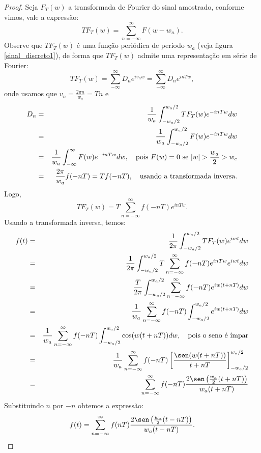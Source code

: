 \begin{proof} Seja $F_T(w)$ a transformada de Fourier do sinal amostrado, conforme vimos, vale a expressão:
\begin{equation}
TF_T(w)=\sum_{n=-\infty}^\infty F(w-w_n).
\end{equation}
Observe que $TF_T(w)$ é uma função periódica de período $w_a$ (veja figura \ref{sinal_discreto1}), de forma que $TF_T(w)$ admite uma representação em série de Fourier:
\begin{equation}
TF_T(w)=\sum_{-\infty}^\infty D_n e^{iv_n w}=\sum_{-\infty}^\infty D_n e^{in Tw},
\end{equation}
onde usamos que $v_n=\frac{2\pi n}{w_a}=Tn$ e 
\begin{eqnarray*}
D_n&=&\frac{1}{w_a}\int_{-w_a/2}^{w_a/2}TF_T(w)e^{-in Tw}dw\\
&=&\frac{1}{w_a}\int_{-w_a/2}^{w_a/2}F(w)e^{-in Tw}dw\\
&=&\frac{1}{w_a}\int_{-\infty}^{\infty}F(w)e^{-in T w}dw,\quad \hbox{pois}\ F(w)=0\ \hbox{se}\ |w|>\frac{w_a}{2}>w_c\\
&=&\frac{2\pi}{w_a}f(-nT)=Tf(-nT),\quad \hbox{usando a transformada inversa}.
\end{eqnarray*}
Logo,
\begin{equation}
TF_T(w)=T\sum_{n=-\infty}^\infty f(-nT) e^{in Tw}.
\end{equation}
Usando a transformada inversa, temos:
\begin{eqnarray*}
f(t)&=&\frac{1}{2\pi}\int_{-w_a/2}^{w_a/2}TF_T(w) e^{i w t}dw\\
&=&\frac{1}{2\pi}\int_{-w_a/2}^{w_a/2}T\sum_{n=-\infty}^\infty f(-nT) e^{in Tw} e^{i w t}dw\\
&=&\frac{T}{2\pi}\int_{-w_a/2}^{w_a/2}\sum_{n=-\infty}^\infty f(-nT) e^{iw(t+nT)} dw\\
&=&\frac{1}{w_a}\sum_{n=-\infty}^\infty f(-nT)\int_{-w_a/2}^{w_a/2}  e^{iw(t+nT)} dw\\
&=&\frac{1}{w_a}\sum_{n=-\infty}^\infty f(-nT)\int_{-w_a/2}^{w_a/2}  \cos(w(t+nT)) dw,\quad \hbox{pois o seno é ímpar}\\
&=&\frac{1}{w_a}\sum_{n=-\infty}^\infty f(-nT)\left[  \frac{\sen(w(t+nT))}{t+nT} \right]_{-w_a/2}^{w_a/2}\\
&=&\sum_{n=-\infty}^\infty f(-nT) \frac{2\sen\left(\frac{w_a}{2}(t+nT)\right)}{w_a(t+nT)} 
\end{eqnarray*}
Substituindo $n$ por $-n$ obtemos a expressão:
\begin{equation}
f(t)=\sum_{n=-\infty}^\infty f(nT) \frac{2\sen\left(\frac{w_a}{2}(t-nT)\right)}{w_a(t-nT)}.
\end{equation}
\end{proof}


